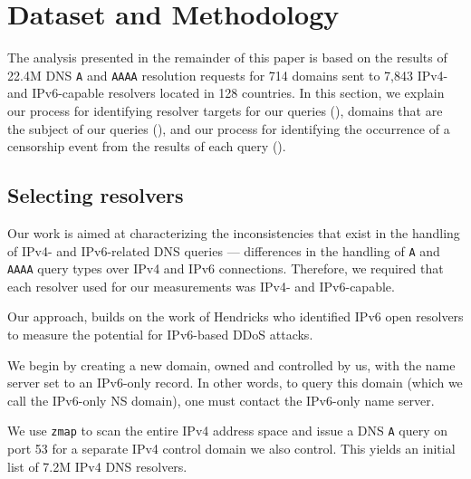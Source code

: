 \section{Dataset and Methodology}\label{sec:methodology}

The analysis presented in the remainder of this paper is based on the results of
22.4M DNS {\tt A} and {\tt AAAA} resolution requests for 714 domains sent to
7,843 IPv4- and IPv6-capable resolvers located in 128 countries.
%
In this section, we explain our process for identifying resolver targets for
our queries (), domains that are the subject of
our queries (), and our process for identifying
the occurrence of a censorship event from the results of each query
().

\subsection{Selecting resolvers} \label{sec:methodology:resolvers}
%
Our work is aimed at characterizing the inconsistencies that exist in the
handling of IPv4- and IPv6-related DNS queries --- \ie differences in the
handling of {\tt A} and {\tt AAAA} query types over IPv4 and IPv6
connections. Therefore, we required that each resolver used for our
measurements was IPv4- and IPv6-capable.
%

Our approach, builds on the work of Hendricks \etal
\cite{hendriks2017potential} who identified IPv6 open resolvers to measure the
potential for IPv6-based DDoS attacks.

We begin by creating a new domain, owned and controlled by us, with the name server
set to an IPv6-only record. In other words, to query this domain (which we call
the IPv6-only NS domain), one must contact the IPv6-only name server.
%

We use {\tt zmap} \cite{Durumeric13zmap} to scan the entire IPv4 address
space and issue a DNS {\tt A} query on port 53 for a separate IPv4 control
domain we also control. This yields an initial list of 7.2M IPv4 DNS resolvers.
%

